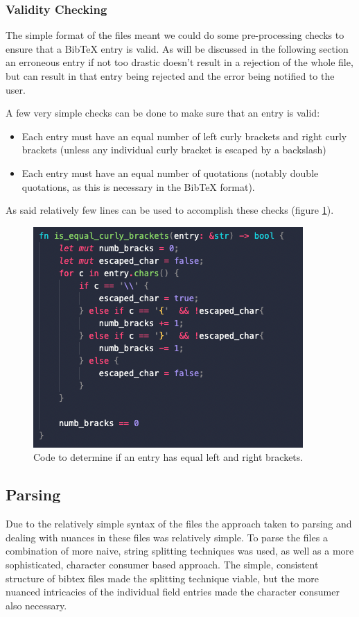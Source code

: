 \documentclass[a4paper,11pt]{article}
\begin{document}
\subsubsection{Validity Checking}
The simple format of the files meant we could do some pre-processing checks to ensure that a BibTeX entry is valid. As will be discussed in the following section an erroneous entry if not too drastic doesn't result in a rejection of the whole file, but can result in that entry being rejected and the error being notified to the user.

A few very simple checks can be done to make sure that an entry is valid:

\begin{itemize}
    \item Each entry must have an equal number of left curly brackets and right curly brackets (unless any individual curly bracket is escaped by a backslash)
    \item Each entry must have an equal number of quotations (notably double quotations, as this is necessary in the BibTeX format).
\end{itemize}

As said relatively few lines can be used to accomplish these checks (figure \ref{fig:equalCurly}). 
\begin{figure}
    \centering
    \includegraphics[width=0.5\linewidth]{images/equalCurlyBrackets.png}
    \caption{Code to determine if an entry has equal left and right brackets.}
    \label{fig:equalCurly}
\end{figure}

\subsection{Parsing}
Due to the relatively simple syntax of the files the approach taken to parsing and dealing with nuances in these files was relatively simple. To parse the files a combination of more naive, string splitting techniques was used, as well as a more sophisticated, character consumer based approach. The simple, consistent structure of bibtex files made the splitting technique viable, but the more nuanced intricacies of the individual field entries made the character consumer also necessary. 
\end{document}

